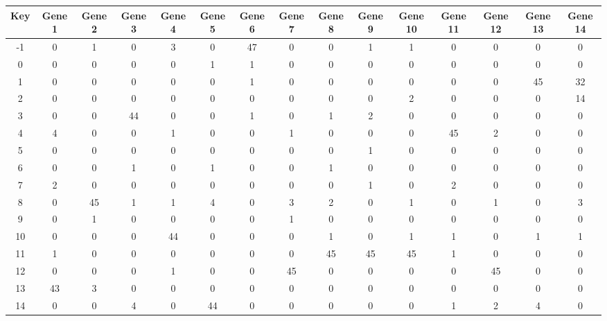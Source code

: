 \begin{tabular}{|c|c|c|c|c|c|c|c|c|c|c|c|c|c|c|}
\hline
Key & Gene 1 & Gene 2 & Gene 3 & Gene 4 & Gene 5 & Gene 6 & Gene 7 & Gene 8 & Gene 9 & Gene 10 & Gene 11 & Gene 12 & Gene 13 & Gene 14 \\
\hline
-1 & 0 & 1 & 0 & 3 & 0 & 47 & 0 & 0 & 1 & 1 & 0 & 0 & 0 & 0 \\
0 & 0 & 0 & 0 & 0 & 1 & 1 & 0 & 0 & 0 & 0 & 0 & 0 & 0 & 0 \\
1 & 0 & 0 & 0 & 0 & 0 & 1 & 0 & 0 & 0 & 0 & 0 & 0 & 45 & 32 \\
2 & 0 & 0 & 0 & 0 & 0 & 0 & 0 & 0 & 0 & 2 & 0 & 0 & 0 & 14 \\
3 & 0 & 0 & 44 & 0 & 0 & 1 & 0 & 1 & 2 & 0 & 0 & 0 & 0 & 0 \\
4 & 4 & 0 & 0 & 1 & 0 & 0 & 1 & 0 & 0 & 0 & 45 & 2 & 0 & 0 \\
5 & 0 & 0 & 0 & 0 & 0 & 0 & 0 & 0 & 1 & 0 & 0 & 0 & 0 & 0 \\
6 & 0 & 0 & 1 & 0 & 1 & 0 & 0 & 1 & 0 & 0 & 0 & 0 & 0 & 0 \\
7 & 2 & 0 & 0 & 0 & 0 & 0 & 0 & 0 & 1 & 0 & 2 & 0 & 0 & 0 \\
8 & 0 & 45 & 1 & 1 & 4 & 0 & 3 & 2 & 0 & 1 & 0 & 1 & 0 & 3 \\
9 & 0 & 1 & 0 & 0 & 0 & 0 & 1 & 0 & 0 & 0 & 0 & 0 & 0 & 0 \\
10 & 0 & 0 & 0 & 44 & 0 & 0 & 0 & 1 & 0 & 1 & 1 & 0 & 1 & 1 \\
11 & 1 & 0 & 0 & 0 & 0 & 0 & 0 & 45 & 45 & 45 & 1 & 0 & 0 & 0 \\
12 & 0 & 0 & 0 & 1 & 0 & 0 & 45 & 0 & 0 & 0 & 0 & 45 & 0 & 0 \\
13 & 43 & 3 & 0 & 0 & 0 & 0 & 0 & 0 & 0 & 0 & 0 & 0 & 0 & 0 \\
14 & 0 & 0 & 4 & 0 & 44 & 0 & 0 & 0 & 0 & 0 & 1 & 2 & 4 & 0 \\
\hline
\end{tabular}